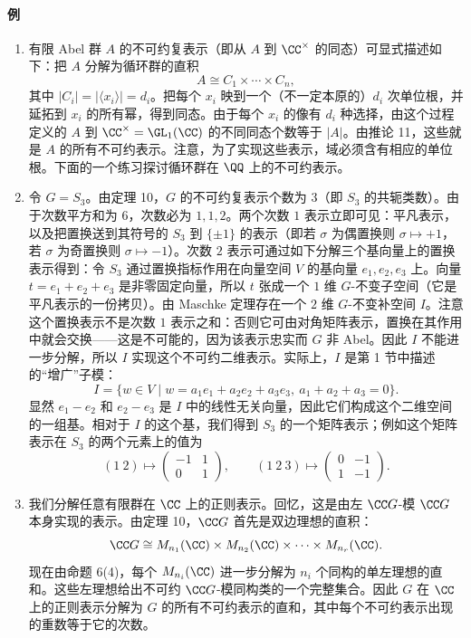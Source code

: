 \paragraph{例}
\begin{enumerate}[label=(\arabic*)]
  \item 有限 Abel 群 $A$ 的不可约复表示（即从 $A$ 到 $\CC^\times$ 的同态）可显式描述如下：把 $A$ 分解为循环群的直积
  \[
    A\cong C_1\times\cdots\times C_n,
  \]
  其中 $|C_i|=|\langle x_i\rangle|=d_i$。把每个 $x_i$ 映到一个（不一定本原的）$d_i$ 次单位根，并延拓到 $x_i$ 的所有幂，得到同态。由于每个 $x_i$ 的像有 $d_i$ 种选择，由这个过程定义的 $A$ 到 $\CC^\times=\GL_1(\CC)$ 的不同同态个数等于 $|A|$。由推论 11，这些就是 $A$ 的所有不可约表示。注意，为了实现这些表示，域必须含有相应的单位根。下面的一个练习探讨循环群在 $\QQ$ 上的不可约表示。

  \item 令 $G=S_3$。由定理 10，$G$ 的不可约复表示个数为 $3$（即 $S_3$ 的共轭类数）。由于次数平方和为 $6$，次数必为 $1,1,2$。两个次数 $1$ 表示立即可见：平凡表示，以及把置换送到其符号的 $S_3$ 到 $\{\pm1\}$ 的表示（即若 $\sigma$ 为偶置换则 $\sigma\mapsto+1$，若 $\sigma$ 为奇置换则 $\sigma\mapsto-1$）。次数 $2$ 表示可通过如下分解三个基向量上的置换表示得到：令 $S_3$ 通过置换指标作用在向量空间 $V$ 的基向量 $e_1,e_2,e_3$ 上。向量 $t=e_1+e_2+e_3$ 是非零固定向量，所以 $t$ 张成一个 $1$ 维 $G$-不变子空间（它是平凡表示的一份拷贝）。由 Maschke 定理存在一个 $2$ 维 $G$-不变补空间 $I$。注意这个置换表示不是次数 $1$ 表示之和：否则它可由对角矩阵表示，置换在其作用中就会交换——这是不可能的，因为该表示忠实而 $G$ 非 Abel。因此 $I$ 不能进一步分解，所以 $I$ 实现这个不可约二维表示。实际上，$I$ 是第 1 节中描述的“增广”子模：
  \[
    I=\{w\in V\mid w=a_1e_1+a_2e_2+a_3e_3,
    \ a_1+a_2+a_3=0\}.
  \]
  显然 $e_1-e_2$ 和 $e_2-e_3$ 是 $I$ 中的线性无关向量，因此它们构成这个二维空间的一组基。相对于 $I$ 的这个基，我们得到 $S_3$ 的一个矩阵表示；例如这个矩阵表示在 $S_3$ 的两个元素上的值为
  \[
    (1\ 2)\mapsto\begin{pmatrix}-1&1\\0&1\end{pmatrix},
    \qquad
    (1\ 2\ 3)\mapsto\begin{pmatrix}0&-1\\1&-1\end{pmatrix}.
  \]

  \item 我们分解任意有限群在 $\CC$ 上的正则表示。回忆，这是由左 $\CC G$-模 $\CC G$ 本身实现的表示。由定理 10，$\CC G$ 首先是双边理想的直积：
  \[
    \CC G\cong M_{n_1}(\CC)\times M_{n_2}(\CC)\times\cdots\times M_{n_r}(\CC).
  \]
  现在由命题 6(4)，每个 $M_{n_i}(\CC)$ 进一步分解为 $n_i$ 个同构的单左理想的直和。这些左理想给出不可约 $\CC G$-模同构类的一个完整集合。因此 $G$ 在 $\CC$ 上的正则表示分解为 $G$ 的所有不可约表示的直和，其中每个不可约表示出现的重数等于它的次数。
\end{enumerate}


